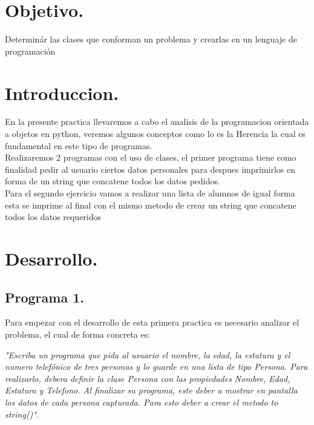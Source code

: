 \documentclass[12pt]{article}
\begin{document}
\newpage																		

\tableofcontents 

\newpage

\section{Objetivo.}

Determinár las clases que conforman un problema y crearlas en un lenguaje de programación


\section{Introduccion.} 
En la presente practica llevaremos a cabo el analisis de la programacion orientada a objetos en python, veremos algunos conceptos como lo  es la Herencia la cual es fundamental en este tipo de programas.\\
Realizaremos 2 programas con el uso de clases, el primer programa tiene como finalidad pedir al usuario ciertos datos personales para despues imprimirlos en forma de un string que concatene todos los datos pedidos.\\
Para el segundo ejercicio vamos a realizar una lista de alumnos de igual forma esta se imprime al final con el mismo metodo de crear un string que concatene todos los datos requeridos

\section{Desarrollo.}
\subsection{Programa 1.}
Para empezar con el desarrollo de esta primera practica es necesario analizar el problema, el cual de forma concreta es:

\textit{"Escriba un programa que pida al usuario el nombre, la edad, la estatura y el numero
telefónico de tres personas y lo guarde en una lista de tipo Persona. Para realizarlo, debera
definir la clase Persona con las propiedades Nombre, Edad, Estatura y Telefono.
Al finalizar su programa,  este deber a mostrar en pantalla los datos de cada persona capturada. Para esto deber a crear el metodo to string()".}
\end{document}

